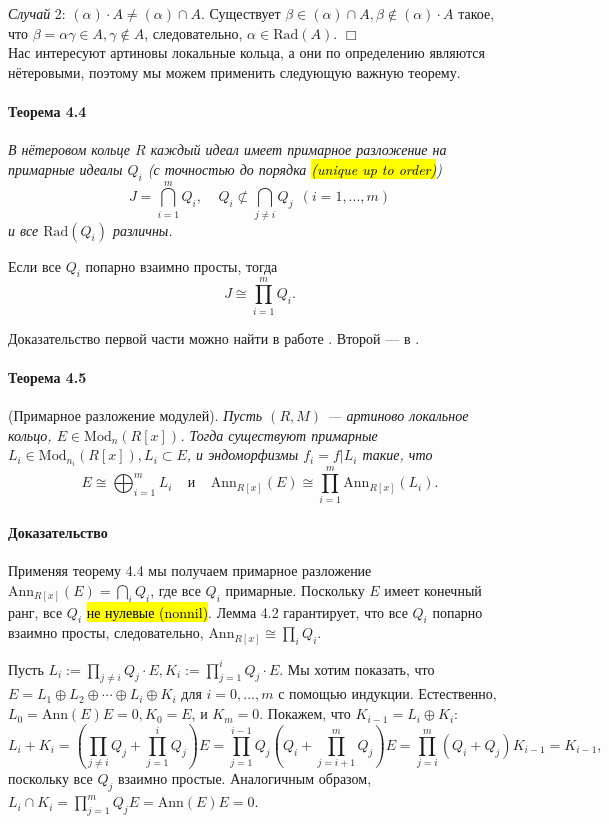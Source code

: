 \documentclass[a4paper,12pt]{article}
\newcommand{\Ann}{\text{Ann}}
\newcommand{\Rad}{\text{Rad}}
\newcommand{\Mod}{\text{Mod}}
\begin{document}
\textit{Случай} 2: $(\alpha) \cdot A \ne (\alpha) \cap A$. Существует $\beta \in (\alpha) \cap A, \beta \notin (\alpha) \cdot A$ такое, что $\beta = \alpha \gamma \in A, \gamma \notin A$, следовательно, $\alpha \in \Rad(A)$. $\Box$ \\

Нас интересуют артиновы локальные кольца, а они по определению являются нётеровыми, поэтому мы можем применить следующую важную теорему.

\paragraph{Теорема 4.4}
{\itshape
В нётеровом кольце $R$ каждый идеал имеет примарное разложение на примарные идеалы $Q_i$ (с точностью до порядка \hl{(unique up to order)})
$$
J = \bigcap_{i=1}^{m} Q_i, ~~~~~ Q_i \not \subset \bigcap_{j \ne i} Q_j ~~ (i = 1, ..., m)
$$
и все $\Rad(Q_i)$ различны.

Если все $Q_i$ попарно взаимно просты, тогда
$$
J \cong \prod_{i=1}^{m} Q_i.
$$
}

Доказательство первой части можно найти в работе \cite{bib3}. Второй --- в \cite{bib13}.

\paragraph{Теорема 4.5}
(Примарное разложение модулей). {\itshape
Пусть $(R, M)$ --- артиново локальное кольцо, $E \in \Mod_n (R[x])$. Тогда существуют примарные $L_i \in \Mod_{n_i}(R[x]), L_i \subset E$, и эндоморфизмы $f_i = f|L_i$ такие, что
$$
E \cong \bigoplus_{i=1}^m L_i ~~~~~ \textit{и} ~~~~~ \Ann_{R[x]}(E) \cong \prod_{i=1}^{m} \Ann_{R[x]} (L_i).
$$
}

\paragraph{Доказательство}
Применяя теорему 4.4 мы получаем примарное разложение $\Ann_{R[x]} (E) = \bigcap_{i} Q_i$, где все $Q_i$ примарные. Поскольку $E$ имеет конечный ранг, все $Q_i$ \hl{не нулевые (nonnil)}. Лемма 4.2 гарантирует, что все $Q_i$ попарно взаимно просты, следовательно, $\Ann_{R[x]} \cong \prod_{i} Q_i$.

Пусть $L_i := \prod_{j \ne i} Q_j \cdot E, K_i := \prod_{j=1}^{i} Q_j \cdot E$. Мы хотим показать, что $E = L_1 \oplus L_2 \oplus \cdots \oplus L_i \oplus K_i$ для $i = 0, ..., m$ с помощью индукции.
Естественно, $L_0 = \Ann(E) E = 0, K_0 = E$, и $K_m = 0$. Покажем, что $K_{i-1} = L_i \oplus K_i$:
$$
L_i + K_i = \left( \prod_{j \ne i} Q_j + \prod_{j=1}^{i}Q_j\right) E = \prod_{j = 1}^{i - 1}Q_j \left( Q_i + \prod_{j = i+1}^{m} Q_j \right) E = \prod_{j = i}^{m} (Q_i + Q_j) K_{i-1} = K_{i-1},
$$
поскольку все $Q_j$ взаимно простые. Аналогичным образом, $L_i \cap K_i = \prod_{j=1}^{m} Q_j E = \Ann(E) E = 0$.
\end{document}
